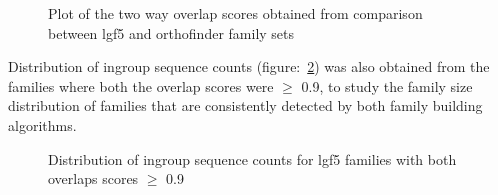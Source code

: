 \documentclass{article}
\begin{document}
		\begin{figure}[h!]
			\caption{Plot of the two way overlap scores obtained from comparison between lgf5 and orthofinder family sets}
			\label{fig:scatter_lgf5_vs_orthofinder_overlap_lgf5}
		\end{figure}
		
		Distribution of ingroup sequence counts (figure:~\ref{fig:hist_seq_ct_lgf5_vs_orthofinder_90percent_overlap}) was also obtained from the families where both the overlap scores were $\geq$ 0.9, to study the family size distribution of families that are consistently detected by both family building algorithms. 
		\begin{figure}[h!]
			\caption{Distribution of ingroup sequence counts for lgf5 families with both overlaps scores $\geq$ 0.9 }
			\label{fig:hist_seq_ct_lgf5_vs_orthofinder_90percent_overlap}
		\end{figure}
		
\end{document}
